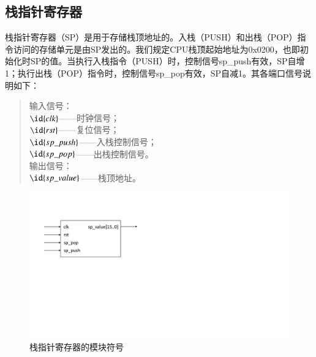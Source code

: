 \documentclass[titlepage, 11pt]{article}
\begin{document}
	\subsection{栈指针寄存器}
		栈指针寄存器（SP）是用于存储栈顶地址的。入栈（PUSH）和出栈（POP）指令访问的存储单元是由SP发出的。我们规定CPU栈顶起始地址为0x0200，也即初始化时SP的值。当执行入栈指令（PUSH）时，控制信号sp\_push有效，SP自增1；执行出栈（POP）指令时，控制信号sp\_pop有效，SP自减1。其各端口信号说明如下：
			\begin{quote}
				输入信号：\\
				$\id{clk}$——时钟信号；\\
				$\id{rst}$——复位信号；\\
				$\id{sp\_push}$——入栈控制信号；\\
				$\id{sp\_pop}$——出栈控制信号。\\
				输出信号：\\
				$\id{sp\_value}$——栈顶地址。
			\end{quote}
			\begin{figure}[H]
				\centering
				\includegraphics[scale=0.5]{27.pdf}
				\caption{栈指针寄存器的模块符号}
			\end{figure}
\end{document}
